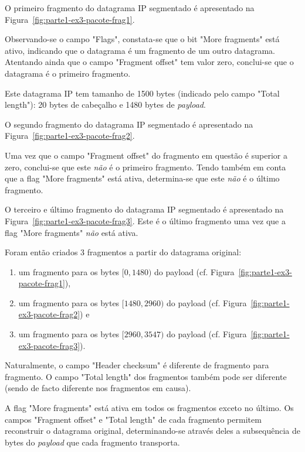 
O primeiro fragmento do datagrama IP segmentado é apresentado na
Figura~\ref{fig:parte1-ex3-pacote-frag1}.

Observando-se o campo "Flags", constata-se que o bit "More fragments" está
ativo, indicando que o datagrama é um fragmento de um outro datagrama. Atentando
ainda que o campo "Fragment offset" tem valor zero, conclui-se que o datagrama é
o primeiro fragmento.

Este datagrama IP tem tamanho de 1500 bytes (indicado pelo campo "Total
length"): 20 bytes de cabeçalho e 1480 bytes de \emph{payload}.


O segundo fragmento do datagrama IP segmentado é apresentado na
Figura~\ref{fig:parte1-ex3-pacote-frag2}.

Uma vez que o campo "Fragment offset" do fragmento em questão é superior a zero,
conclui-se que este \emph{não} é o primeiro fragmento. Tendo também em conta que
a flag "More fragments" está ativa, determina-se que este \emph{não} é o último
fragmento.


O terceiro e último fragmento do datagrama IP segmentado é apresentado na
Figura~\ref{fig:parte1-ex3-pacote-frag3}. Este é o último fragmento uma vez que
a flag "More fragments" \emph{não} está ativa.

Foram então criados 3 fragmentos a partir do datagrama original:

\begin{enumerate}
  \item um fragmento para os bytes \([0, 1480)\) do payload (cf.
  Figura~\ref{fig:parte1-ex3-pacote-frag1}),
  \item um fragmento para os bytes \([1480, 2960)\) do payload (cf.
  Figura~\ref{fig:parte1-ex3-pacote-frag2}) e
  \item um fragmento para os bytes \([2960, 3547)\) do payload (cf.
  Figura~\ref{fig:parte1-ex3-pacote-frag3}).
\end{enumerate}


Naturalmente, o campo "Header checksum" é diferente de fragmento para fragmento.
O campo "Total length" dos fragmentos também pode ser diferente (sendo de facto
diferente nos fragmentos em causa).

A flag "More fragments" está ativa em todos os fragmentos exceto no último. Os
campos "Fragment offset" e "Total length" de cada fragmento permitem reconstruir
o datagrama original, determinando-se através deles a subsequência de bytes do
\emph{payload} que cada fragmento transporta.

